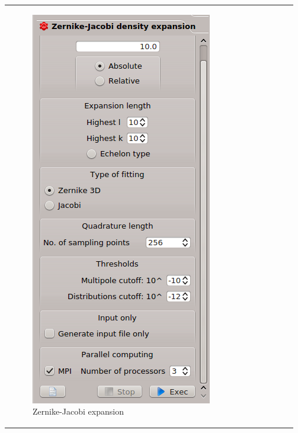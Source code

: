 \documentclass[10pt]{article}
\begin{document}
\begin{tabular}{lr}
\begin{minipage}{.5\linewidth}
\vspace*{-15mm}
\begin{figure}[H]
\begin{center}
\vspace*{4cm}
\includegraphics[width=.5\linewidth]{damqt_fig_2_13.png}
\end{center}
\vspace*{2.4cm}
\caption{{Zernike-Jacobi expansion}\label{fig:2_13}}
\end{figure}
\end{minipage}
&
\begin{minipage}{.5\linewidth}
\begin{figure}[H]
\begin{center}
\vspace*{0mm}

\end{center}
\end{figure}
\end{minipage}
\end{tabular}
\end{document}
